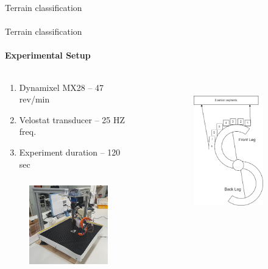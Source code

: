 \documentclass[aspectratio=169]{beamer}
\begin{document}
\begin{frame}[t]{Terrain classification}
    \framesubtitle{}
\end{frame}

\begin{frame}[t]{Terrain classification}
    \framesubtitle{Experimental Setup}
    \vspace{-15pt}
    \begin{columns}[T,onlytextwidth]
        \begin{column}{0.49\textwidth}
            \begin{enumerate}
                \item Dynamixel MX28 -- 47 rev/min
                \item Velostat transducer -- 25 HZ freq.
                \item Experiment duration -- 120 sec
            \end{enumerate}
            \vspace{-0.3cm}
            \begin{figure}[H]
                \centering\includegraphics[height=4cm,width=1\textwidth,keepaspectratio]{s_shape_leg/s_leg_setup.JPG}
                \label{fig:s_shape_leg/}
            \end{figure}
        \end{column}
        \begin{column}{0.49\textwidth}
            \vspace{-0.5cm}
            \begin{figure}[H]
                \begin{subfigure}{\textwidth}
                    \centering\includegraphics[height=6cm,width=1\textwidth,keepaspectratio]{s_shape_leg/leg_design.png}

\end{subfigure}
\end{figure}
\end{column}
\end{columns}
\end{frame}
\end{document}
